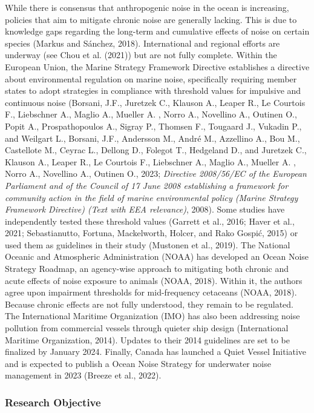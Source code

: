\documentclass[
]{article}
\begin{document}
While there is consensus that anthropogenic noise in the ocean is
increasing, policies that aim to mitigate chronic noise are generally
lacking. This is due to knowledge gaps regarding the long-term and
cumulative effects of noise on certain species (Markus and Sánchez,
2018). International and regional efforts are underway (see Chou et al.
(2021)) but are not fully complete. Within the European Union, the
Marine Strategy Framework Directive establishes a directive about
environmental regulation on marine noise, specifically requiring member
states to adopt strategies in compliance with threshold values for
impulsive and continuous noise (Borsani, J.F., Juretzek C., Klauson A.,
Leaper R., Le Courtois F., Liebschner A., Maglio A., Mueller A. , Norro
A., Novellino A., Outinen O., Popit A., Prospathopoulos A., Sigray P.,
Thomsen F., Tougaard J., Vukadin P., and Weilgart L., Borsani, J.F.,
Andersson M., André M., Azzellino A., Bou M., Castellote M., Ceyrac L.,
Dellong D., Folegot T., Hedgeland D., and Juretzek C., Klauson A.,
Leaper R., Le Courtois F., Liebschner A., Maglio A., Mueller A. , Norro
A., Novellino A., Outinen O., 2023; \emph{Directive 2008/56/EC of the
European Parliament and of the Council of 17 June 2008 establishing a
framework for community action in the field of marine environmental
policy (Marine Strategy Framework Directive) (Text with EEA relevance)},
2008). Some studies have independently tested these threshold values
(Garrett et al., 2016; Haver et al., 2021; Sebastianutto, Fortuna,
Mackelworth, Holcer, and Rako Gospić, 2015) or used them as guidelines
in their study (Mustonen et al., 2019). The National Oceanic and
Atmospheric Administration (NOAA) has developed an Ocean Noise Strategy
Roadmap, an agency-wise approach to mitigating both chronic and acute
effects of noise exposure to animals (NOAA, 2018). Within it, the
authors agree upon impairment thresholds for mid-frequency cetaceans
(NOAA, 2018). Because chronic effects are not fully understood, they
remain to be regulated. The International Maritime Organization (IMO)
has also been addressing noise pollution from commercial vessels through
quieter ship design (International Maritime Organization, 2014). Updates
to their 2014 guidelines are set to be finalized by January 2024.
Finally, Canada has launched a Quiet Vessel Initiative and is expected
to publish a Ocean Noise Strategy for underwater noise management in
2023 (Breeze et al., 2022).

\hypertarget{research-objective}{%
\subsubsection{Research Objective}\label{research-objective}}
\end{document}
